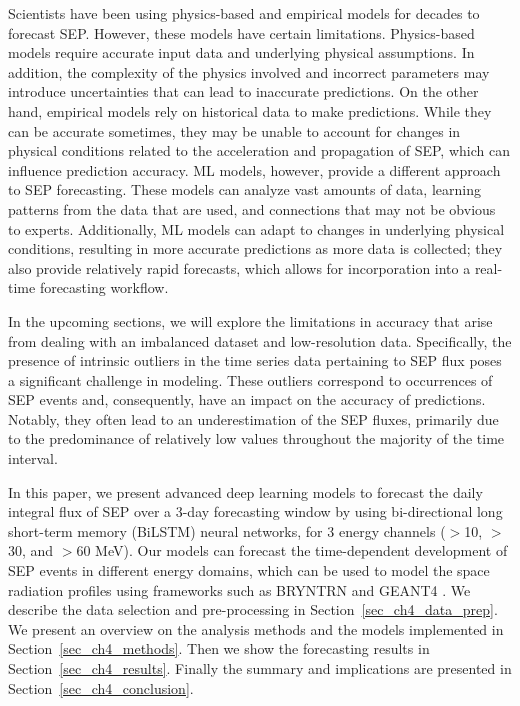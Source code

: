 Scientists have been using physics-based and empirical models for decades to forecast SEP. However, these models have certain limitations. Physics-based models require accurate input data and underlying physical assumptions. In addition, the complexity of the physics involved and incorrect parameters may introduce uncertainties that can lead to inaccurate predictions.
On the other hand, empirical models rely on historical data to make predictions.
While they can be accurate sometimes, they may be unable to account for changes in physical conditions related to the acceleration and propagation of SEP, which can influence prediction accuracy.
ML models, however, provide a different approach to SEP forecasting. These models can analyze vast amounts of data, learning patterns from the data that are used, and connections that may not be obvious to experts. Additionally, ML models can adapt to changes in underlying physical conditions, resulting in more accurate predictions as more data is collected; they also provide relatively rapid forecasts, which allows for incorporation into a real-time forecasting workflow.

In the upcoming sections, we will explore the limitations in accuracy that arise from dealing with an imbalanced dataset and low-resolution data. Specifically, the presence of intrinsic outliers in the time series data pertaining to SEP flux poses a significant challenge in modeling. These outliers correspond to occurrences of SEP events and, consequently, have an impact on the accuracy of predictions. Notably, they often lead to an underestimation of the SEP fluxes, primarily due to the predominance of relatively low values throughout the majority of the time interval.

In this paper, we present advanced deep learning models to forecast the daily integral flux of SEP over a 3-day forecasting window by using bi-directional long short-term memory (BiLSTM) neural networks, for 3 energy channels ($>$10, $>$30, and $>$60 MeV).
Our models can forecast the time-dependent development of SEP events in different energy domains, which can be used to model the space radiation profiles using frameworks such as BRYNTRN \cite{wilson_1988} and GEANT4 \citep{truscott_2000}.
We describe the data selection and pre-processing in Section~\ref{sec_ch4_data_prep}. We present an overview on the analysis methods and the models implemented in Section~\ref{sec_ch4_methods}. Then we show the forecasting results in Section~\ref{sec_ch4_results}. Finally the summary and implications are presented in Section~\ref{sec_ch4_conclusion}.

